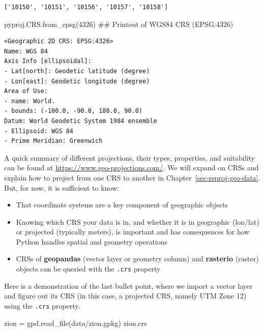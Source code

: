 \documentclass[
  letterpaper,
]{krantz}
\newenvironment{Shaded}{\begin{snugshade}}{\end{snugshade}}
\newcommand{\CommentTok}[1]{\textcolor[rgb]{0.37,0.37,0.37}{#1}}
\newcommand{\DecValTok}[1]{\textcolor[rgb]{0.68,0.00,0.00}{#1}}
\newcommand{\NormalTok}[1]{\textcolor[rgb]{0.00,0.23,0.31}{#1}}
\newcommand{\OperatorTok}[1]{\textcolor[rgb]{0.37,0.37,0.37}{#1}}
\newcommand{\StringTok}[1]{\textcolor[rgb]{0.13,0.47,0.30}{#1}}
\providecommand{\tightlist}{%
  \setlength{\itemsep}{0pt}\setlength{\parskip}{0pt}}\usepackage{longtable,booktabs,array}
\begin{document}
\begin{verbatim}
['10150', '10151', '10156', '10157', '10158']
\end{verbatim}

\begin{Shaded}
\begin{Highlighting}[]
\NormalTok{pyproj.CRS.from\_epsg(}\DecValTok{4326}\NormalTok{)  }\CommentTok{\#\# Printout of WGS84 CRS (EPSG:4326)}
\end{Highlighting}
\end{Shaded}

\begin{verbatim}
<Geographic 2D CRS: EPSG:4326>
Name: WGS 84
Axis Info [ellipsoidal]:
- Lat[north]: Geodetic latitude (degree)
- Lon[east]: Geodetic longitude (degree)
Area of Use:
- name: World.
- bounds: (-180.0, -90.0, 180.0, 90.0)
Datum: World Geodetic System 1984 ensemble
- Ellipsoid: WGS 84
- Prime Meridian: Greenwich
\end{verbatim}

A quick summary of different projections, their types, properties, and
suitability can be found at \url{https://www.geo-projections.com/}. We
will expand on CRSs and explain how to project from one CRS to another
in Chapter~\ref{sec-reproj-geo-data}. But, for now, it is sufficient to
know:

\begin{itemize}
\tightlist
\item
  That coordinate systems are a key component of geographic objects
\item
  Knowing which CRS your data is in, and whether it is in geographic
  (lon/lat) or projected (typically meters), is important and has
  consequences for how Python handles spatial and geometry operations
\item
  CRSs of \textbf{geopandas} (vector layer or geometry column) and
  \textbf{rasterio} (raster) objects can be queried with the
  \texttt{.crs} property
\end{itemize}

Here is a demonstration of the last bullet point, where we import a
vector layer and figure out its CRS (in this case, a projected CRS,
namely UTM Zone 12) using the \texttt{.crs} property.

\begin{Shaded}
\begin{Highlighting}[]
\NormalTok{zion }\OperatorTok{=}\NormalTok{ gpd.read\_file(}\StringTok{\textquotesingle{}data/zion.gpkg\textquotesingle{}}\NormalTok{)}
\NormalTok{zion.crs}
\end{Highlighting}
\end{Shaded}
\end{document}
